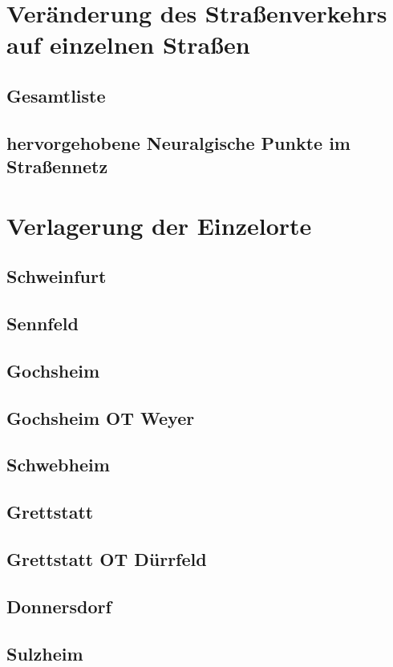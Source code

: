 \documentclass[fontsize=12pt,a4paper]{scrreprt}
\begin{document}
\section{Veränderung des Straßenverkehrs auf einzelnen Straßen}
                \subsection{Gesamtliste}
                \subsection{hervorgehobene Neuralgische Punkte im Straßennetz}
        \section{Verlagerung der Einzelorte}
                \subsection{Schweinfurt}
                \subsection{Sennfeld}
                \subsection{Gochsheim}
                \subsection{Gochsheim OT Weyer}
                \subsection{Schwebheim}
                \subsection{Grettstatt}
                \subsection{Grettstatt OT Dürrfeld}
                \subsection{Donnersdorf}
                \subsection{Sulzheim}
\end{document}
